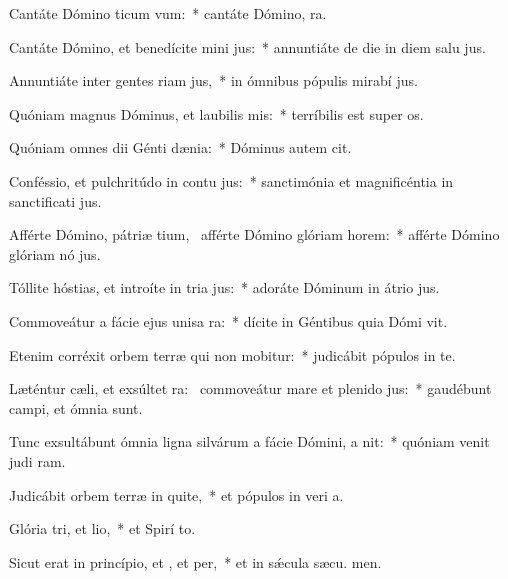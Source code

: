 \item Cantáte Dómino ticum vum:~* cantáte Dómino,  ra.
\item Cantáte Dómino, et benedícite mini jus:~* annuntiáte de die in diem salu jus.
\item Annuntiáte inter gentes riam jus,~* in ómnibus pópulis mirabí jus.
\item Quóniam magnus Dóminus, et laubilis mis:~* terríbilis est super  os.
\item Quóniam omnes dii Génti dænia:~* Dóminus autem  cit.
\item Conféssio, et pulchritúdo in contu jus:~* sanctimónia et magnificéntia in sanctificati jus.
\item Afférte Dómino, pátriæ tium,~\pscross{} afférte Dómino glóriam  horem:~* afférte Dómino glóriam nó jus.
\item Tóllite hóstias, et introíte in tria jus:~* adoráte Dóminum in átrio  jus.
\item Commoveátur a fácie ejus unisa ra:~* dícite in Géntibus quia Dómi vit.
\item Etenim corréxit orbem terræ qui non mobitur:~* judicábit pópulos in te.
\item Læténtur cæli, et exsúltet ra:~\pscross{} commoveátur mare et plenido jus:~* gaudébunt campi, et ómnia    sunt.
\item Tunc exsultábunt ómnia ligna silvárum a fácie Dómini, a nit:~* quóniam venit judi ram.
\item Judicábit orbem terræ in quite,~* et pópulos in veri a.
\item Glória tri, et lio,~* et Spirí to.
\item Sicut erat in princípio, et , et per,~* et in sǽcula sæcu. men.

